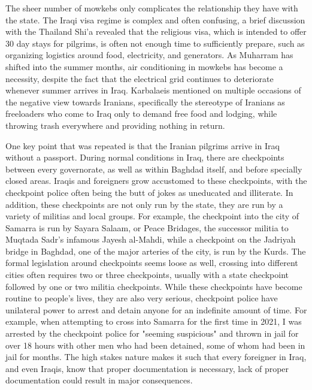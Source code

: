The sheer number of mowkebs only complicates the relationship they have with the state. The Iraqi visa regime is complex and often confusing, a brief discussion with the Thailand Shi'a revealed that the religious visa, which is intended to offer 30 day stays for pilgrims, is often not enough time to sufficiently prepare, such as organizing logistics around food, electricity, and generators. As Muharram has shifted into the summer months, air conditioning in mowkebs has become a necessity, despite the fact that the electrical grid continues to deteriorate whenever summer arrives in Iraq. Karbalaeis mentioned on multiple occasions of the negative view towards Iranians, specifically the stereotype of Iranians as freeloaders who come to Iraq only to demand free food and lodging, while throwing trash everywhere and providing nothing in return. 

One key point that was repeated is that the Iranian pilgrims arrive in Iraq without a passport. During normal conditions in Iraq, there are checkpoints between every governorate, as well as within Baghdad itself, and before specially closed areas. Iraqis and foreigners grow accustomed to these checkpoints, with the checkpoint police often being the butt of jokes as uneducated and illiterate. In addition, these checkpoints are not only run by the state, they are run by a variety of militias and local groups. For example, the checkpoint into the city of Samarra is run by Sayara Salaam, or Peace Bridages, the successor militia to Muqtada Sadr's infamous Jayesh al-Mahdi, while a checkpoint on the Jadriyah bridge in Baghdad, one of the major arteries of the city, is run by the Kurds. The formal legislation around checkpoints seems loose as well, crossing into different cities often requires two or three checkpoints, usually with a state checkpoint followed by one or two militia checkpoints. While these checkpoints have become routine to people's lives, they are also very serious, checkpoint police have unilateral power to arrest and detain anyone for an indefinite amount of time. For example, when attempting to cross into Samarra for the first time in 2021, I was arrested by the checkpoint police for "seeming suspicious" and thrown in jail for over 18 hours with other men who had been detained, some of whom had been in jail for months. The high stakes nature makes it such that every foreigner in Iraq, and even Iraqis, know that proper documentation is necessary, lack of proper documentation could result in major consequences. 

